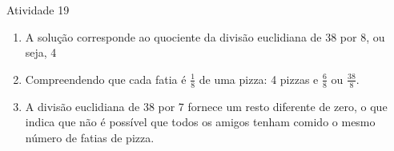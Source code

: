 \begin{multicols}{2}
\begin{resposta*}{Atividade 19}
\begin{enumerate} [\quad a)] %
    \item       A solução corresponde ao quociente da divisão euclidiana de 38 por 8, ou seja, 4
    \item       Compreendendo que cada fatia é       $\frac{1}{8}$ de uma pizza: 4 pizzas e       $\frac{6}{8}$ ou       $\frac{38}{8}$.
    \item       A divisão euclidiana de 38 por 7 fornece um resto diferente de zero, o que indica que não é possível que todos os amigos tenham comido o mesmo número de fatias de pizza.
\end{enumerate} %
\end{resposta*}


\end{multicols}
